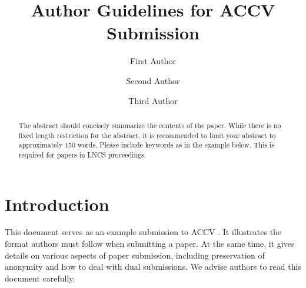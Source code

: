 \documentclass[runningheads]{llncs}
\begin{document}
\title{Author Guidelines for ACCV Submission} 


\author{First Author \and
Second Author \and
Third Author}



\maketitle


\begin{abstract}
  The abstract should concisely summarize the contents of the paper. 
  While there is no fixed length restriction for the abstract, it is recommended to limit your abstract to approximately 150 words.
  Please include keywords as in the example below. 
  This is required for papers in LNCS proceedings.
\end{abstract}


\section{Introduction}
\label{sec:intro}

This document serves as an example submission to ACCV \ACCVyear{}.
It illustrates the format authors must follow when submitting a paper. 
At the same time, it gives details on various aspects of paper submission, including preservation of anonymity and how to deal with dual submissions.
We advise authors to read this document carefully.
\end{document}
